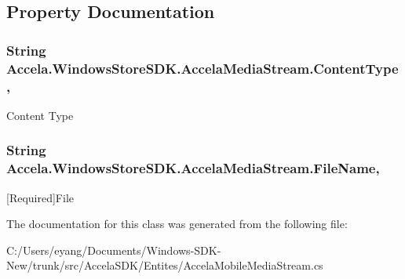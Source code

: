 \subsection{Property Documentation}
\hypertarget{class_accela_1_1_windows_store_s_d_k_1_1_accela_media_stream_a3b20b14706281bd09712fd2256c74a81}{
\subsubsection[{Content\+Type}]{\setlength{\rightskip}{0pt plus 5cm}String Accela.\+Windows\+Store\+S\+D\+K.\+Accela\+Media\+Stream.\+Content\+Type\hspace{0.3cm}{\ttfamily [get]}, {\ttfamily [set]}}}\label{class_accela_1_1_windows_store_s_d_k_1_1_accela_media_stream_a3b20b14706281bd09712fd2256c74a81}


Content Type 

\hypertarget{class_accela_1_1_windows_store_s_d_k_1_1_accela_media_stream_a88369967d8475ac2d6e86cc865704ade}{
\subsubsection[{File\+Name}]{\setlength{\rightskip}{0pt plus 5cm}String Accela.\+Windows\+Store\+S\+D\+K.\+Accela\+Media\+Stream.\+File\+Name\hspace{0.3cm}{\ttfamily [get]}, {\ttfamily [set]}}}\label{class_accela_1_1_windows_store_s_d_k_1_1_accela_media_stream_a88369967d8475ac2d6e86cc865704ade}


\mbox{[}Required\mbox{]}File 



The documentation for this class was generated from the following file\+:\begin{DoxyCompactItemize}
\item 
C\+:/\+Users/eyang/\+Documents/\+Windows-\/\+S\+D\+K-\/\+New/trunk/src/\+Accela\+S\+D\+K/\+Entites/Accela\+Mobile\+Media\+Stream.\+cs\end{DoxyCompactItemize}
